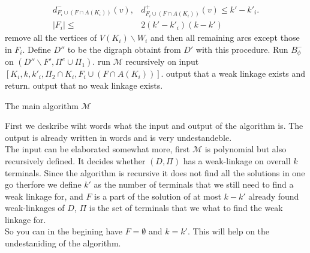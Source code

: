 \begin{algorithm}
\begin{algorithmic}[1]
{                \begin{align}
                    d^-_{F_i\cup(F\cap A(K_i))}(v),&d^+_{F_i\cup(F\cap A(K_i))}(v)\leq k'-k'_i.\\
                    |F_i|\leq &2(k'-k'_i)(k-k')
                \end{align}
                }
                        \STATE remove all the vertices of $V(K_i)\backslash W_i$ and then all remaining arcs except those in $F_i$.
                    \ENDFOR
                    \STATE Define $D''$ to be the digraph obtaint from $D'$ with this procedure.
                    \STATE Run $B_{\phi}^-$ on $(D''\backslash F',\Pi^e\cup\Pi_1)$.
                        \STATE run $\mathcal{M}$ recursively on input $[K_i,k,k'_i,\Pi_2\cap K_i,F_i\cup(F\cap A(K_i))]$.
                    \ENDFOR 
                \ENDFOR
            \ENDIF
                \STATE output that a weak linkage exists and return.
            \ENDIF
        \ENDFOR 
            \STATE output that no weak linkage exists.
        \ENDIF
    \end{algorithmic}
    \caption{The main algorithm $\mathcal{M}$}
    \label{alg:weakphi}
\end{algorithm}


 

    First we deskribe wiht words what the input and output of the algorithm is. 
    The output is already written in words and is very undestandeble. \\
    The input can be elaborated somewhat more, first $\mathcal{M}$ is polynomial but also recursively defined. 
    It decides whether $(D,\Pi)$  has a weak-linkage on overall $k$ terminals. 
    Since the algorithm is recursive it does not find all the solutions in one go therfore we define $k'$ as the number of terminals that we still need to find a weak linkage for, and $F$ is a part of the solution of at most $k-k'$ already found weak-linkages of $D$, $\Pi$ is the set of terminals that we what to find the weak linkage for. \\
    So you can in the begining have $F=\emptyset$ and $k=k'$. This will help on the undestaniding of the algorithm.    
 
